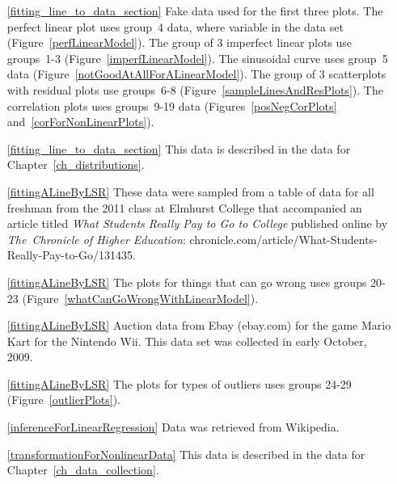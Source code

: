 






\begin{itemize}
\item[\ref{fitting_line_to_data_section}]
    Fake data used for the first three plots.
    The perfect linear plot uses group~4 data,
    where  variable in the data set
    (Figure~\ref{perfLinearModel}).
    The group of 3 imperfect linear plots use groups~1-3
    (Figure~\ref{imperfLinearModel}).
    The sinusoidal curve uses group~5 data
    (Figure~\ref{notGoodAtAllForALinearModel}).
        The group of 3 scatterplots with residual plots use groups~6-8
    (Figure~\ref{sampleLinesAndResPlots}).
    The correlation plots uses groups~9-19 data
    (Figures~\ref{posNegCorPlots} and~\ref{corForNonLinearPlots}).
\item[\ref{fitting_line_to_data_section}]
    This data is described in
    the data for Chapter~\ref{ch_distributions}.

\item[\ref{fittingALineByLSR}]
    These data were sampled from a table of data for all
    freshman from the 2011 class at Elmhurst College that
    accompanied an article titled
    \emph{What Students Really Pay to Go to College}
    published online by \emph{The~Chronicle of Higher Education}:
        {chronicle.com/article/What-Students-Really-Pay-to-Go/131435}.
\item[\ref{fittingALineByLSR}]
    The plots for things that can go wrong uses groups 20-23
    (Figure~\ref{whatCanGoWrongWithLinearModel}).
\item[\ref{fittingALineByLSR}]
    Auction data from Ebay (ebay.com) for the game Mario Kart
    for the Nintendo Wii.
    This data set was collected in early October, 2009.

\item[\ref{fittingALineByLSR}]
    The plots for types of outliers uses groups 24-29
    (Figure~\ref{outlierPlots}).

\item[\ref{inferenceForLinearRegression}]
    Data was retrieved from Wikipedia.

\item[\ref{transformationForNonlinearData}]
    This data is described in
    the data for Chapter~\ref{ch_data_collection}.

\end{itemize}


